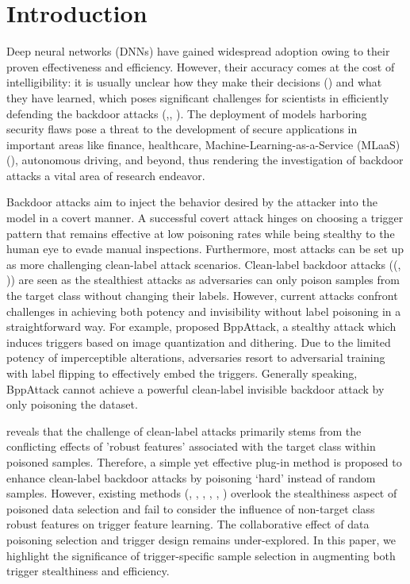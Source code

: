 \documentclass{article}
\begin{document}
\section{Introduction}
Deep neural networks (DNNs) have gained widespread adoption owing to their proven effectiveness and efficiency. However, their accuracy comes at the cost of intelligibility: it is usually unclear how they make their decisions (\citet{radenovic2022neural}) and what they have learned, which poses significant challenges for scientists in efficiently defending the backdoor attacks (\citet{doan2021backdoor},\citet{287378}, \citet{10.1145/3576915.3616617}). The deployment of models harboring security flaws pose a threat to the development of secure applications in important areas like ﬁnance, healthcare, Machine-Learning-as-a-Service (MLaaS)(\citet{huang2024uba}), autonomous driving, and beyond, thus rendering the investigation of backdoor attacks a vital area of research endeavor. 

Backdoor attacks aim to inject the behavior desired by the attacker into the model in a covert manner. A successful covert attack hinges on choosing a trigger pattern that remains effective at low poisoning rates while being stealthy to the human eye to evade manual inspections. Furthermore, most attacks can be set up as more challenging clean-label attack scenarios. Clean-label backdoor attacks ((\citet{huynh2024combat}, \citet{zhao2024exploring})) are seen as the stealthiest attacks as adversaries can only poison samples from the target class without changing their labels. However, current attacks confront challenges in achieving both potency and invisibility without label poisoning in a straightforward way. For example, \citet{wang2022bppattack} proposed BppAttack, a stealthy attack which induces triggers based on image quantization and dithering. Due to the limited potency of imperceptible alterations, adversaries resort to adversarial training with label flipping to effectively embed the triggers. Generally speaking, BppAttack cannot achieve a powerful clean-label invisible backdoor attack by only poisoning the dataset.

\citet{gao2023not} reveals that the challenge of clean-label attacks primarily stems from the conflicting effects of 'robust features' associated with the target class within poisoned samples.  Therefore, a simple yet effective plug-in method is proposed to enhance clean-label backdoor attacks by poisoning ‘hard’ instead of random samples. However, existing methods (\citet{hayase2022few}, \citet{li2023explore}, \citet{li2024proxy}, \citet{hungwicked}, \citet{wang2025not}, \citet{han2024backdooring}) overlook the stealthiness aspect of poisoned data selection and fail to consider the influence of non-target class robust features on trigger feature learning. The collaborative effect of data poisoning selection and trigger design remains under-explored. In this paper, we highlight the significance of trigger-specific sample selection in augmenting both trigger stealthiness and efficiency.
\end{document}
